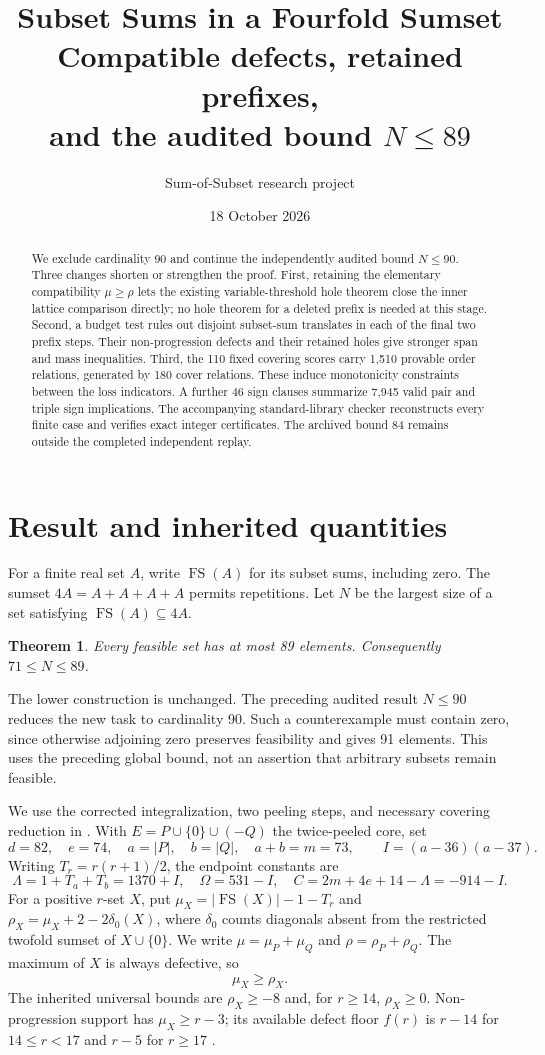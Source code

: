 \documentclass[11pt,a4paper]{article}
\title{Subset Sums in a Fourfold Sumset\\\large Compatible defects, retained prefixes,\\and the audited bound $N\le89$}
\author{Sum-of-Subset research project}
\date{18 October 2026}
\newcommand{\FS}{\operatorname{FS}}
\newtheorem{theorem}{Theorem}[section]
\begin{document}
\maketitle
\begin{abstract}
We exclude cardinality 90 and continue the independently audited bound
$N\le90$. Three changes shorten or strengthen the proof. First, retaining
the elementary compatibility $\mu\ge\rho$ lets the existing variable-threshold
hole theorem close the inner lattice comparison directly; no hole theorem
for a deleted prefix is needed at this stage. Second, a budget test rules
out disjoint subset-sum translates in each of the final two prefix steps.
Their non-progression defects and their retained holes give stronger span
and mass inequalities. Third, the 110 fixed covering scores carry 1,510
provable order relations, generated by 180 cover relations. These induce
monotonicity constraints between the loss indicators. A further 46 sign
clauses summarize 7,945 valid pair and triple sign implications. The accompanying
standard-library checker reconstructs every finite case and verifies exact
integer certificates. The archived bound 84 remains outside the completed
independent replay.
\end{abstract}

\section{Result and inherited quantities}
For a finite real set $A$, write $\FS(A)$ for its subset sums, including
zero. The sumset $4A=A+A+A+A$ permits repetitions. Let $N$ be the largest
size of a set satisfying $\FS(A)\subseteq4A$.
\begin{theorem}\label{main}
Every feasible set has at most 89 elements. Consequently $71\le N\le89$.
\end{theorem}
The lower construction is unchanged. The preceding audited result
$N\le90$ \cite{previous} reduces the new task to cardinality 90. Such a
counterexample must contain zero, since otherwise adjoining zero preserves
feasibility and gives 91 elements. This uses the preceding global bound,
not an assertion that arbitrary subsets remain feasible.

We use the corrected integralization, two peeling steps, and necessary
covering reduction in \cite{foundation,previous}. With
$E=P\cup\{0\}\cup(-Q)$ the twice-peeled core, set
\[
 d=82,\quad e=74,\quad a=|P|,\quad b=|Q|,\quad a+b=m=73,
 \qquad I=(a-36)(a-37).
\]
Writing $T_r=r(r+1)/2$, the endpoint constants are
\[
 \Lambda=1+T_a+T_b=1370+I,\quad \Omega=531-I,
 \quad C=2m+4e+14-\Lambda=-914-I.
\]
For a positive $r$-set $X$, put
$\mu_X=|\FS(X)|-1-T_r$ and
$\rho_X=\mu_X+2-2\delta_0(X)$, where $\delta_0$ counts diagonals
absent from the restricted twofold sumset of $X\cup\{0\}$.
We write $\mu=\mu_P+\mu_Q$ and $\rho=\rho_P+\rho_Q$.
The maximum of $X$ is always defective, so
\begin{equation}\label{compatibility}
 \mu_X\ge\rho_X.
\end{equation}
The inherited universal bounds are $\rho_X\ge-8$ and, for $r\ge14$,
$\rho_X\ge0$. Non-progression support has $\mu_X\ge r-3$;
its available defect floor $f(r)$ is $r-14$ for $14\le r<17$ and
$r-5$ for $r\ge17$ \cite{sharp}.
\end{document}
